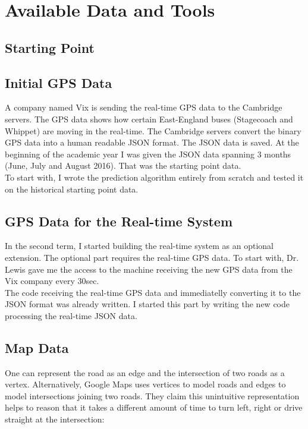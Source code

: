 \documentclass[12pt,a4paper,oneside,openright]{report}
\begin{document}
\section{Available Data and Tools}

\subsection{Starting Point}

\subsection*{Initial GPS Data}
A company named Vix is sending the real-time GPS data to the Cambridge servers. The GPS
data shows how certain East-England buses (Stagecoach and Whippet) are moving 
in the real-time. The Cambridge servers convert the binary GPS data into a human readable
JSON format. The JSON data is saved. At the beginning of the academic year I was given the
JSON data spanning 3 months (June, July and August 2016).
That was the starting point data. \\

To start with, I wrote the prediction algorithm entirely from scratch and tested it on the historical
starting point data.

\subsection*{GPS Data for the Real-time System}
In the second term, I started building the real-time system as an optional extension.
The optional part requires the real-time GPS data. To start with, Dr. Lewis gave me
the access to the machine receiving the new GPS data from the Vix company every 30sec. \\

The code receiving the real-time GPS data and immediatelly converting it to the JSON format was already written. I started this part by writing the new code processing the real-time JSON data.

\subsection{Map Data}

One can represent the road as an edge and the intersection of two roads as a vertex.
Alternatively, Google Maps uses vertices to model roads and edges to model intersections
joining two roads. They claim this unintuitive representation helps to reason that
it takes a different amount of time to turn left, right or drive straight at the intersection: \\
\end{document}
